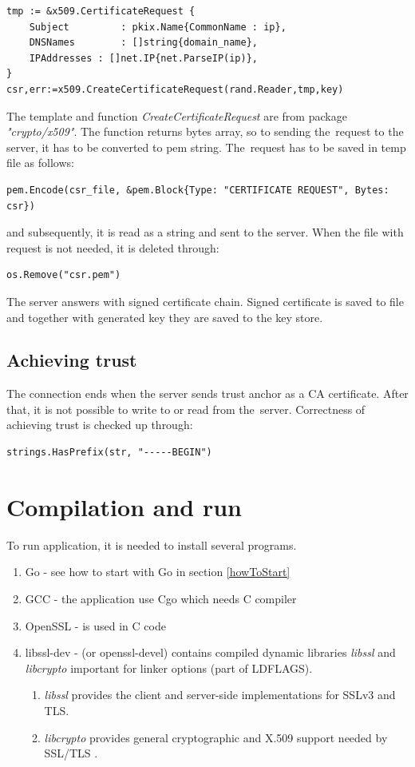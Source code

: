 \documentclass[
  oneside, 12pt, 
  printed, %
  notable,   %
  nolof,     %
  nolot,     %
]{fithesis3}
\begin{document}
\begin{lstlisting}
tmp := &x509.CertificateRequest {
	Subject 		: pkix.Name{CommonName : ip},
	DNSNames 		: []string{domain_name},
	IPAddresses : []net.IP{net.ParseIP(ip)},
}
csr,err:=x509.CreateCertificateRequest(rand.Reader,tmp,key)
\end{lstlisting}

The template and function \textit{CreateCertificateRequest} are from package 
\textit{"crypto/x509"}. The function returns bytes array, so to sending the~request to the server, 
it has to be converted to pem string. The~request has to be saved in temp file as follows:
\begin{lstlisting}
pem.Encode(csr_file, &pem.Block{Type: "CERTIFICATE REQUEST", Bytes: csr})
\end{lstlisting}
and subsequently, it is read as a string and sent to the server. When the file with request is not 
needed, it is deleted through:
\begin{lstlisting}
os.Remove("csr.pem")
\end{lstlisting}
The server answers with signed certificate chain. Signed certificate is saved to file and together 
with generated key they are saved to the key store.

\subsection{Achieving trust}
The connection ends when the server sends trust anchor as a CA certificate. After that, it is not 
possible to write to or read from the~server. Correctness of achieving trust is checked up 
through:
\begin{lstlisting}
strings.HasPrefix(str, "-----BEGIN")
\end{lstlisting}

\section{Compilation and run}
To run application, it is needed to install several programs.
\begin{enumerate}
\item Go - see how to start with Go in section \ref{howToStart}
\item GCC - the application use Cgo which needs C compiler
\item OpenSSL - is used in C code
\item libssl-dev - (or openssl-devel) contains compiled dynamic libraries \textit{libssl} and \textit{libcrypto} important for linker options (part of LDFLAGS). 
\begin{enumerate}
  \item \textit{libssl} provides the client and server-side implementations for SSLv3 and TLS.
  \item \textit{libcrypto} provides general cryptographic and X.509 support needed by SSL/TLS \cite{opensslgit}.
\end{enumerate}
\end{enumerate}
\end{document}

